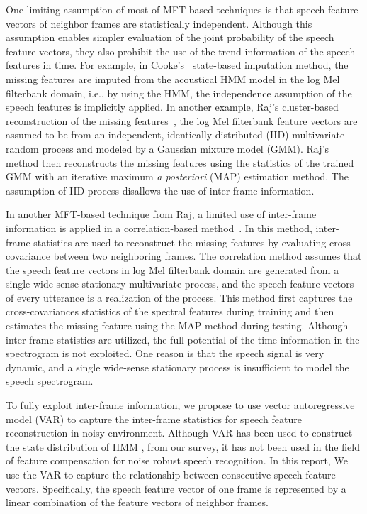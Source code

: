 One limiting assumption of most of MFT-based techniques is that
speech feature vectors of neighbor frames are statistically
independent. Although this assumption enables simpler evaluation of
the joint probability of the speech feature vectors, they also
prohibit the use of the trend information of the speech features in
time. For example, in Cooke's~\cite{Cooke2001} state-based
imputation method, the missing features are imputed from the
acoustical HMM model in the log Mel filterbank domain, i.e., by
using the HMM, the independence assumption of the speech features is
implicitly applied. In another example, Raj's cluster-based
reconstruction of the missing features~\cite{Raj04}, the log Mel
filterbank feature vectors are assumed to be from an independent,
identically distributed (IID) multivariate random process and
modeled by a Gaussian mixture model (GMM). Raj's method then
reconstructs the missing features using the statistics of the
trained GMM with an iterative maximum \emph{a posteriori} (MAP)
estimation method. The assumption of IID process disallows the use
of inter-frame information.

In another MFT-based technique from Raj, a limited use of
inter-frame information is applied in a correlation-based
method~\cite{Raj04}. In this method, inter-frame statistics are used
to reconstruct the missing features by evaluating cross-covariance
between two neighboring frames. The correlation method assumes that
the speech feature vectors in log Mel filterbank domain are
generated from a single wide-sense stationary multivariate process,
and the speech feature vectors of every utterance is a realization
of the process. This method first captures the cross-covariances
statistics of the spectral features during training and then
estimates the missing feature using the MAP method during testing.
Although inter-frame statistics are utilized, the full potential of
the time information in the spectrogram is not exploited. One reason
is that the speech signal is very dynamic, and a single wide-sense
stationary process is insufficient to model the speech spectrogram.

To fully exploit inter-frame information, we propose to use vector
autoregressive model (VAR) to capture the inter-frame statistics for
speech feature reconstruction in noisy environment. Although VAR has
been used to construct the state distribution of HMM
\cite{VAR_Lutkepohl}, from our survey, it has not been used in the
field of feature compensation for noise robust speech recognition.
In this report, We use the VAR to capture the relationship between
consecutive speech feature vectors. Specifically, the speech feature
vector of one frame is represented by a linear combination of the
feature vectors of neighbor frames.

